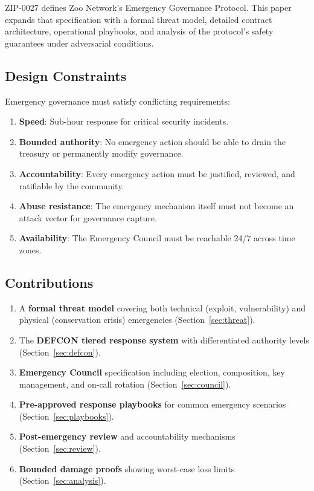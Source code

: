 \documentclass[11pt,letterpaper]{article}
\begin{document}
ZIP-0027 defines Zoo Network's Emergency Governance Protocol. This paper expands that specification with a formal threat model, detailed contract architecture, operational playbooks, and analysis of the protocol's safety guarantees under adversarial conditions.

\subsection{Design Constraints}

Emergency governance must satisfy conflicting requirements:

\begin{enumerate}
    \item \textbf{Speed}: Sub-hour response for critical security incidents.
    \item \textbf{Bounded authority}: No emergency action should be able to drain the treasury or permanently modify governance.
    \item \textbf{Accountability}: Every emergency action must be justified, reviewed, and ratifiable by the community.
    \item \textbf{Abuse resistance}: The emergency mechanism itself must not become an attack vector for governance capture.
    \item \textbf{Availability}: The Emergency Council must be reachable 24/7 across time zones.
\end{enumerate}

\subsection{Contributions}

\begin{enumerate}
    \item A \textbf{formal threat model} covering both technical (exploit, vulnerability) and physical (conservation crisis) emergencies (Section~\ref{sec:threat}).
    \item The \textbf{DEFCON tiered response system} with differentiated authority levels (Section~\ref{sec:defcon}).
    \item \textbf{Emergency Council} specification including election, composition, key management, and on-call rotation (Section~\ref{sec:council}).
    \item \textbf{Pre-approved response playbooks} for common emergency scenarios (Section~\ref{sec:playbooks}).
    \item \textbf{Post-emergency review} and accountability mechanisms (Section~\ref{sec:review}).
    \item \textbf{Bounded damage proofs} showing worst-case loss limits (Section~\ref{sec:analysis}).
\end{enumerate}
\end{document}
